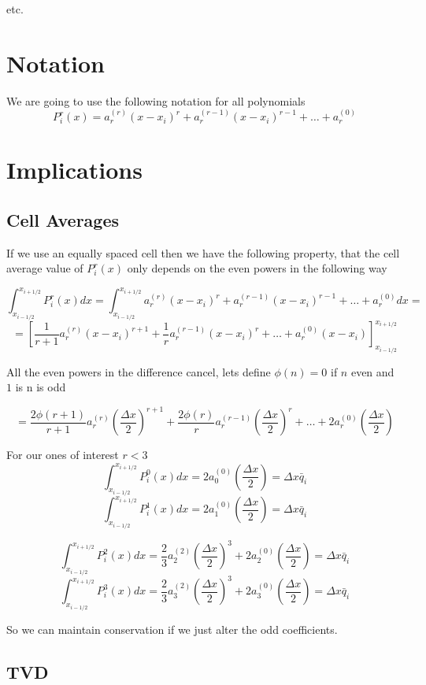 \documentclass[10pt]{article}
\begin{document}
etc.

\section{Notation}
We are going to use the following notation for all polynomials
\[P^r_i(x) = a^{(r)}_r(x  - x_i)^r + a^{(r-1)}_r(x  - x_i)^{r-1} + \dots + a^{(0)}_r\]

\section{Implications}
\subsection{Cell Averages}
If we use an equally spaced cell then we have the following property, that the cell average value of $P^r_i(x)$ only depends on the even powers in the following way


\[\int_{x_{i-1/2}}^{x_{i+1/2}} P^r_i(x) dx = \int_{x_{i-1/2}}^{x_{i+1/2}} a^{(r)}_r(x  - x_i)^r + a^{(r-1)}_r(x  - x_i)^{r-1} + \dots + a^{(0)}_rdx   =  \]
\[=\left[  \frac{1}{r+1} a^{(r)}_r(x  - x_i)^{r+1} + \frac{1}{r}a^{(r-1)}_r(x  - x_i)^{r} + \dots + a^{(0)}_r \left(x - x_i\right)\right]_{x_{i-1/2}}^{x_{i+1/2}}\]

All the even powers in the difference cancel, lets define $\phi(n) = 0$ if $n$ even and $1$ is n is odd

\[=\frac{2 \phi\left(r+1\right)}{r+1} a^{(r)}_r \left(\frac{\Delta x}{2} \right)^{r+1} + \frac{2 \phi\left(r\right)}{r} a^{(r-1)}_{r} \left(\frac{\Delta x}{2} \right)^{r} + \dots +  2a^{(0)}_r \left(\frac{\Delta x}{2}\right) \]

For our ones of interest $r<3$
\[\int_{x_{i-1/2}}^{x_{i+1/2}} P^0_i(x) dx = 2a^{(0)}_0 \left(\frac{\Delta x}{2}\right) = \Delta x \bar{q}_i\]
\[\int_{x_{i-1/2}}^{x_{i+1/2}} P^1_i(x) dx = 2a^{(0)}_1 \left(\frac{\Delta x}{2}\right) = \Delta x \bar{q}_i\]

\[\int_{x_{i-1/2}}^{x_{i+1/2}} P^2_i(x) dx = \frac{2 }{3} a^{(2)}_{2} \left(\frac{\Delta x}{2} \right)^{3}  + 2a^{(0)}_2 \left(\frac{\Delta x}{2}\right) = \Delta x \bar{q}_i\]
\[\int_{x_{i-1/2}}^{x_{i+1/2}} P^3_i(x) dx = \frac{2 }{3} a^{(2)}_{3} \left(\frac{\Delta x}{2} \right)^{3}  + 2a^{(0)}_3 \left(\frac{\Delta x}{2}\right) = \Delta x \bar{q}_i\]


So we can maintain conservation if we just alter the odd coefficients.

\subsection{TVD}
\end{document}
